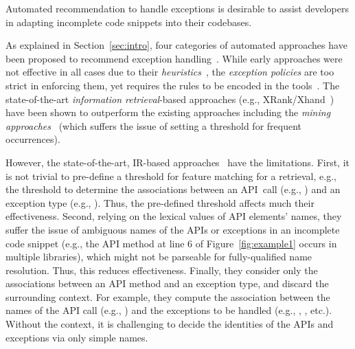 \begin{Observation} 
\label{ob1}
Automated recommendation to handle exceptions is desirable to
assist developers in adapting incomplete code snippets into their
codebases.
\end{Observation}


As explained in Section~\ref{sec:intro},  four
categories of automated approaches have been proposed to recommend
exception
handling~\cite{xrank-fse20,barbosa-bsse12,chanchal-scam14,barbosa-tse18,barbosa-tse16}. While
early approaches were not effective in all cases due to their {\em
  heuristics}~\cite{barbosa-bsse12}, the {\em exception policies} are
too strict in enforcing them, yet requires the rules to be encoded in
the tools~\cite{barbosa-tse16,barbosa-saner18}. The state-of-the-art
{\em information retrieval}-based approaches (e.g.,
XRank/Xhand~\cite{xrank-fse20}) have been shown to outperform the
existing approaches including the {\em mining
  approaches}~\cite{chanchal-scam14} (which suffers the issue of setting a
threshold for frequent occurrences).


However, the state-of-the-art, IR-based approaches~\cite{xrank-fse20}
have the limitations. First, it is not trivial to pre-define
a threshold for feature matching for a retrieval, e.g., the threshold
to determine the associations between an API~call (e.g.,
) and an exception type (e.g.,
). Thus, the pre-defined threshold
affects much their effectiveness.
%
Second, relying on the lexical values of API elements' names, they
suffer the issue of ambiguous names of the APIs or exceptions in an
incomplete code snippet (e.g., the API method  at line 6 of
Figure~\ref{fig:example1} occurs in multiple libraries), which might
not be parseable for fully-qualified name resolution. Thus, this
reduces effectiveness. Finally, they consider only the associations
between an API method and an exception type, and discard the
surrounding context.
For example, they compute the association between the names of the API
call (e.g., ) and the exceptions to be
handled (e.g., ,
, etc.). Without the context, it is
challenging to decide the identities of the APIs and exceptions via
only simple names.

